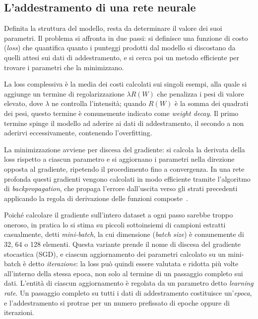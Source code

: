 \subsection{L'addestramento di una rete neurale}
\label{sec:addestramento}

Definita la struttura del modello, resta da determinare il valore dei
suoi parametri. Il problema si affronta in due passi: si definisce una
funzione di costo (\emph{loss}) che quantifica quanto i punteggi
prodotti dal modello si discostano da quelli attesi sui dati di
addestramento, e si cerca poi un metodo efficiente per trovare i
parametri che la minimizzano.

La loss complessiva è la media dei costi calcolati sui singoli esempi,
alla quale si aggiunge un termine di regolarizzazione $\lambda R(W)$ che
penalizza i pesi di valore elevato, dove $\lambda$ ne controlla
l'intensità; quando $R(W)$ è la somma dei quadrati dei pesi, questo
termine è comunemente indicato come \emph{weight decay}. Il primo
termine spinge il modello ad aderire ai dati di addestramento, il
secondo a non aderirvi eccessivamente, contenendo l'overfitting.

La minimizzazione avviene per discesa del gradiente: si calcola la
derivata della loss rispetto a ciascun parametro e si aggiornano i
parametri nella direzione opposta al gradiente, ripetendo il
procedimento fino a convergenza. In una rete profonda questi gradienti
vengono calcolati in modo efficiente tramite l'algoritmo di
\emph{backpropagation}, che propaga l'errore dall'uscita verso gli
strati precedenti applicando la regola di derivazione delle funzioni
composte~\cite{rumelhart1986backprop}.

Poiché calcolare il gradiente sull'intero dataset a ogni passo sarebbe
troppo oneroso, in pratica lo si stima su piccoli sottoinsiemi di
campioni estratti casualmente, detti \emph{mini-batch}, la cui dimensione
(\emph{batch size}) è comunemente di 32, 64 o 128 elementi. Questa
variante prende il nome di discesa del gradiente stocastica (SGD), e
ciascun aggiornamento dei parametri calcolato su un mini-batch è detto
\emph{iterazione}: la loss può quindi essere valutata e ridotta più
volte all'interno della stessa epoca, non solo al termine di un
passaggio completo sui dati. L'entità di ciascun aggiornamento è
regolata da un parametro detto \emph{learning rate}. Un passaggio
completo su tutti i dati di addestramento costituisce un'\emph{epoca}, e
l'addestramento si protrae per un numero prefissato di epoche oppure di
iterazioni.

